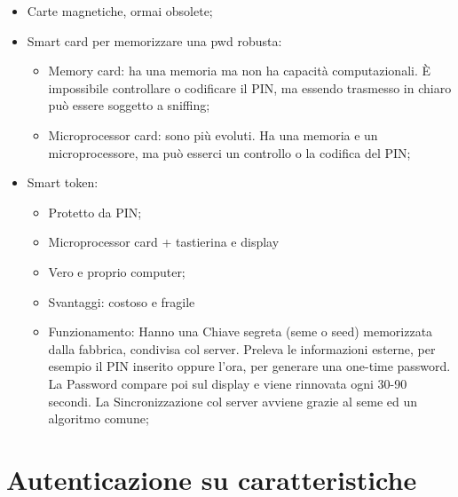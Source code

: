 \begin{itemize}
    \item Carte magnetiche, ormai obsolete;
    \item Smart card per memorizzare una pwd robusta:
          \begin{itemize}
              \item Memory card: ha una memoria ma non ha capacità computazionali.
                    È impossibile
                    controllare o codificare il PIN, ma essendo trasmesso in chiaro può
                    essere soggetto
                    a sniffing;
              \item Microprocessor card: sono più evoluti. Ha una memoria e
                    un microprocessore, ma
                    può esserci un controllo o la codifica del PIN;
          \end{itemize}
    \item Smart token:
          \begin{itemize}
              \item Protetto da PIN;
              \item  Microprocessor card + tastierina e display
              \item  Vero e proprio computer;
              \item  Svantaggi: costoso e fragile
              \item  Funzionamento: Hanno una Chiave segreta (seme o seed)
                    memorizzata dalla fabbrica,
                    condivisa col server. Preleva le informazioni esterne,
                    per esempio il PIN inserito oppure
                    l'ora, per generare una one-time password.
                    La Password compare poi sul display e viene
                    rinnovata ogni 30-90 secondi.
                    La Sincronizzazione col server avviene grazie al seme ed un
                    algoritmo comune;
          \end{itemize}
\end{itemize}

\section{Autenticazione su caratteristiche}

